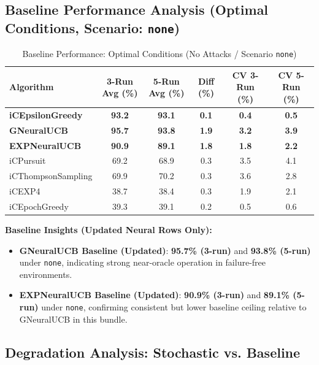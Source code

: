 \documentclass[12pt,a4paper]{article}
\newcommand{\primarytext}[1]{\textcolor{primaryblue}{\textbf{#1}}}
\newcommand{\legacy}[1]{\textcolor{legacycolor}{\textbf{#1}}}
\newcommand{\neural}[1]{\textcolor{neuralcolor}{\textbf{#1}}}
\begin{document}
\subsection{Baseline Performance Analysis (Optimal Conditions, Scenario: \texttt{none})}

\begin{table}[H]
\centering
\caption{Baseline Performance: Optimal Conditions (No Attacks / Scenario \texttt{none})}
\label{tab:baseline-performance}
\begin{tabular}{@{}lccccc@{}}
\toprule
\textbf{Algorithm} & \textbf{3-Run Avg (\%)} & \textbf{5-Run Avg (\%)} & \textbf{Diff (\%)} & \textbf{CV 3-Run (\%)} & \textbf{CV 5-Run (\%)} \\
\midrule
\primarytext{iCEpsilonGreedy}   & \primarytext{93.2} & \primarytext{93.1} & \primarytext{0.1} & \primarytext{0.4} & \primarytext{0.5} \\
\neural{GNeuralUCB}            & \neural{95.7} & \neural{93.8} & \neural{1.9} & \neural{3.2} & \neural{3.9} \\
\legacy{EXPNeuralUCB}           & \legacy{90.9} & \legacy{89.1} & \legacy{1.8} & \legacy{1.8} & \legacy{2.2} \\
iCPursuit                       & 69.2 & 68.9 & 0.3 & 3.5 & 4.1 \\
iCThompsonSampling              & 69.9 & 70.2 & 0.3 & 3.6 & 2.8 \\
iCEXP4                          & 38.7 & 38.4 & 0.3 & 1.9 & 2.1 \\
iCEpochGreedy                   & 39.3 & 39.1 & 0.2 & 0.5 & 0.6 \\
\bottomrule
\end{tabular}
\end{table}

\textbf{Baseline Insights (Updated Neural Rows Only):}
\begin{itemize}
\item \neural{GNeuralUCB Baseline (Updated)}: \neural{95.7\% (3-run)} and \neural{93.8\% (5-run)} under \texttt{none}, indicating strong near-oracle operation in failure-free environments.
\item \legacy{EXPNeuralUCB Baseline (Updated)}: \legacy{90.9\% (3-run)} and \legacy{89.1\% (5-run)} under \texttt{none}, confirming consistent but lower baseline ceiling relative to GNeuralUCB in this bundle.
\end{itemize}

\subsection{Degradation Analysis: Stochastic vs. Baseline}
\end{document}
